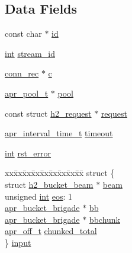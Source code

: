 \subsection*{Data Fields}
\begin{DoxyCompactItemize}
\item 
const char $\ast$ \hyperlink{structh2__task_ad51ebc1a6948a168b5b8c0b589e3d3cd}{id}
\item 
\hyperlink{pcre_8txt_a42dfa4ff673c82d8efe7144098fbc198}{int} \hyperlink{structh2__task_a09e7e9f9e5fdb61206c344f2272d9f20}{stream\+\_\+id}
\item 
\hyperlink{structconn__rec}{conn\+\_\+rec} $\ast$ \hyperlink{structh2__task_a31da3014d93bc040c945182b35b2e573}{c}
\item 
\hyperlink{structapr__pool__t}{apr\+\_\+pool\+\_\+t} $\ast$ \hyperlink{structh2__task_a49fad74f9497dd0ede7236b13a59f228}{pool}
\item 
const struct \hyperlink{structh2__request}{h2\+\_\+request} $\ast$ \hyperlink{structh2__task_a2b29ed50bdcfa0549416978b8048cb78}{request}
\item 
\hyperlink{group__apr__time_gaae2129185a395cc393f76fabf4f43e47}{apr\+\_\+interval\+\_\+time\+\_\+t} \hyperlink{structh2__task_a279d7cdc9f827fcfafdb24868018ec89}{timeout}
\item 
\hyperlink{pcre_8txt_a42dfa4ff673c82d8efe7144098fbc198}{int} \hyperlink{structh2__task_a49f5715c5fc92dae7bbd564f64086eb4}{rst\+\_\+error}
\item 
\begin{tabbing}
xx\=xx\=xx\=xx\=xx\=xx\=xx\=xx\=xx\=\kill
struct \{\\
\>struct \hyperlink{structh2__bucket__beam}{h2\_bucket\_beam} $\ast$ \hyperlink{structh2__task_a6f995ac5b18536f486fc2e50dc8363ad}{beam}\\
\>unsigned \hyperlink{pcre_8txt_a42dfa4ff673c82d8efe7144098fbc198}{int} \hyperlink{structh2__task_ad2558ff9cec52c4cd2d0a51dacaf54cd}{eos}: 1\\
\>\hyperlink{structapr__bucket__brigade}{apr\_bucket\_brigade} $\ast$ \hyperlink{structh2__task_a82bebe65b8eb52621a54a77be1e2367a}{bb}\\
\>\hyperlink{structapr__bucket__brigade}{apr\_bucket\_brigade} $\ast$ \hyperlink{structh2__task_a56210dd30d8de269972b8b52019dcd4a}{bbchunk}\\
\>\hyperlink{group__apr__platform_ga6938af9075cec15c88299109381aa984}{apr\_off\_t} \hyperlink{structh2__task_aa453d27a11faa79974682a4a5ec6afa2}{chunked\_total}\\
\} \hyperlink{structh2__task_ace591dda78eb3f521ceab4a6c76e72a7}{input}\\


\end{tabbing}
\end{DoxyCompactItemize}
